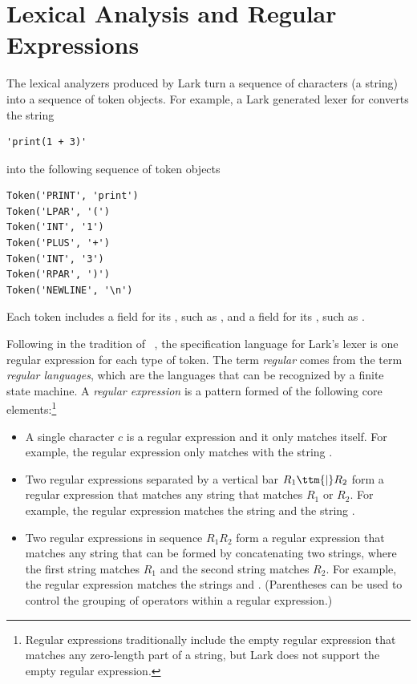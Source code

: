 \documentclass[7x10]{TimesAPriori_MIT}%
\numberwithin{theorem}{chapter}
\numberwithin{definition}{chapter}
\numberwithin{equation}{chapter}
\begin{document}
{\section{Lexical Analysis and Regular Expressions}
\label{sec:lex}

The lexical analyzers produced by Lark turn a sequence of characters
(a string) into a sequence of token objects. For example, a Lark
generated lexer for \LangInt{} converts the string
\begin{lstlisting}
'print(1 + 3)'
\end{lstlisting}
\noindent into the following sequence of token objects
\begin{center}
\begin{minipage}{0.95\textwidth}
\begin{lstlisting}
Token('PRINT', 'print')
Token('LPAR', '(')
Token('INT', '1')
Token('PLUS', '+')
Token('INT', '3')
Token('RPAR', ')')
Token('NEWLINE', '\n')
\end{lstlisting}
\end{minipage}
\end{center}
Each token includes a field for its , such as ,
and a field for its , such as .

Following in the tradition of ~\citep{Lesk:1975uq}, the
specification language for Lark's lexer is one regular expression for
each type of token. The term \emph{regular} comes from the term
\emph{regular languages}, which are the languages that can be
recognized by a finite state machine. A \emph{regular expression} is a
pattern formed of the following core elements:\footnote{Regular expressions traditionally include the
  empty regular expression that matches any zero-length part of a
  string, but Lark does not support the empty regular expression.}
\begin{itemize}
\item A single character $c$ is a regular expression and it only
  matches itself. For example, the regular expression  only
  matches with the string .
  
\item Two regular expressions separated by a vertical bar $R_1 \ttm{|}
  R_2$ form a regular expression that matches any string that matches
  $R_1$ or $R_2$. For example, the regular expression 
  matches the string  and the string .

\item Two regular expressions in sequence $R_1 R_2$ form a regular
  expression that matches any string that can be formed by
  concatenating two strings, where the first string matches $R_1$ and
  the second string matches $R_2$. For example, the regular expression
   matches the strings  and .
  (Parentheses can be used to control the grouping of operators within
  a regular expression.)


\end{itemize}}
\end{document}

